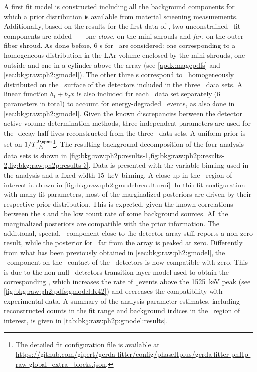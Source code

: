 A first fit model is constructed including all the background components for which a prior
distribution is available from material screening measurements. Additionally, based on the
results for the first data of \phasetwo, two unconstrained \kvn\ fit
components are added~---~one \emph{close}, on the mini-shrouds and \emph{far}, on the
outer fiber shroud. As done before, 6 \pdf{}s for \kvz\ are considered: one corresponding to
a homogeneous distribution in the LAr volume enclosed by the mini-shrouds, one outside and
one in a cylinder above the array (see \cref{apdx:magepdfs} and
\cref{sec:bkg:raw:ph2:gmodel}). The other three \pdf{}s correspond to \kvz\ homogeneously
distributed on the \nplus\ surface of the detectors included in the three \Mone\ data
sets. A linear function $b_1+b_2x$ is also included for each \Mone\ data set
separately (6 parameters in total) to account for energy-degraded \a\ events, as also
done in \cref{sec:bkg:raw:ph2:gmodel}. Given the known discrepancies between the detector
active volume determination methods, three independent parameters are used for the
\nnbb-decay half-lives reconstructed from the three \Mone\ data sets. A uniform prior is
set on $1/\thalftwoM$\footnote{%
  The detailed fit configuration file is available at
  \url{https://github.com/gipert/gerda-fitter/config/phaseIIplus/gerda-fitter-phIIp-raw-global_extra_blocks.json}.
}.
\newpar
The resulting background decomposition of the four analysis data sets is shown in
\cref{fig:bkg:raw:ph2p:results-1,fig:bkg:raw:ph2p:results-2,fig:bkg:raw:ph2p:results-3}.
Data is presented with the variable binning used in the analysis and a fixed-width 15~keV
binning. A close-up in the \onbb\ region of interest is shown in
\cref{fig:bkg:raw:ph2:gmodel:results:roi}. In this fit configuration with many fit parameters,
most of the marginalized posteriors are driven by their respective prior distribution.
This is expected, given the known correlations between the \pdf{}s and the low count rate of
some background sources. All the marginalized posteriors are compatible with the prior
information. The additional, special, \kvn\ component close to the detector array still
reports a non-zero result, while the posterior for \kvn\ far from the array is peaked at
zero.  Differently from what has been previously obtained in
\cref{sec:bkg:raw:ph2:gmodel}, the \kvz\ component on the \nplus\ contact of the \bege\
detectors is now compatible with zero. This is due to the non-null \bege\ detectors
transition layer model used to obtain the corresponding \pdf, which increases the rate of
\b\ events above the 1525~keV peak (see \cref{fig:bkg:raw:ph2:pdfs:gmodel:K42}) and
decreases the compatibility with experimental data. A summary of the analysis parameter
estimates, including reconstructed counts in the fit range and background indices in the
\onbb\ region of interest, is given in \cref{tab:bkg:raw:ph2p:gmodel:results}.

